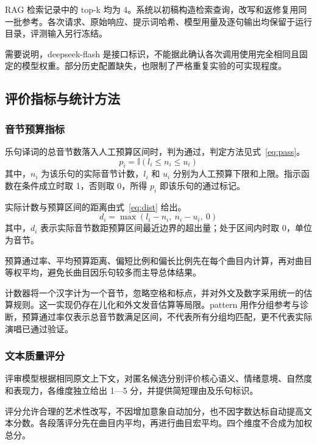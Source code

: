 \documentclass[12pt, a4paper]{ctexart}
\numberwithin{table}{section}
\numberwithin{figure}{section}
\begin{document}
RAG 检索记录中的 top-k 均为 4。系统以初稿构造检索查询，改写和返修复用同一批参考。各次请求、原始响应、提示词哈希、模型用量及逐句输出均保留于运行目录，评测输入另行冻结。

需要说明，deepseek-flash 是接口标识，不能据此确认各次调用使用完全相同且固定的模型权重。部分历史配置缺失，也限制了严格重复实验的可实现程度。

\subsection{评价指标与统计方法}

\subsubsection{音节预算指标}
乐句译词的总音节数落入人工预算区间时，判为通过，判定方法见式~\eqref{eq:pass}。
\begin{equation}
  p_i = \mathbb{I}\left(l_i \le n_i \le u_i\right)
  \label{eq:pass}
\end{equation}
其中，$n_i$ 为该乐句的实际音节计数，$l_i$ 和 $u_i$ 分别为人工预算下限和上限。指示函数在条件成立时取 1，否则取 0，所得 $p_i$ 即该乐句的通过标记。

实际计数与预算区间的距离由式~\eqref{eq:dist} 给出。
\begin{equation}
  d_i = \max\left(l_i - n_i,\ n_i - u_i,\ 0\right)
  \label{eq:dist}
\end{equation}
其中，$d_i$ 表示实际音节数距预算区间最近边界的超出量；处于区间内时取 0，单位为音节。

预算通过率、平均预算距离、偏短比例和偏长比例先在每个曲目内计算，再对曲目等权平均，避免长曲目因乐句较多而主导总体结果。

计数器将一个汉字计为一个音节，忽略空格和标点，并对外文及数字采用统一的估算规则。这一实现仍存在儿化和外文发音估算等局限。pattern 用作分组参考与诊断，预算通过率仅表示总音节数满足区间，不代表所有分组均匹配，更不代表实际演唱已通过验证。

\subsubsection{文本质量评分}
评审模型根据相同原文上下文，对匿名候选分别评价核心语义、情绪意境、自然度和表现力，各维度独立给出 1—5 分，并提供简短理由及乐句标识。

评分允许合理的艺术性改写，不因增加意象自动加分，也不因字数达标自动提高文本分数。各段落评分先在曲目内平均，再进行曲目宏平均。四个维度不合成为加权总分。
\end{document}
